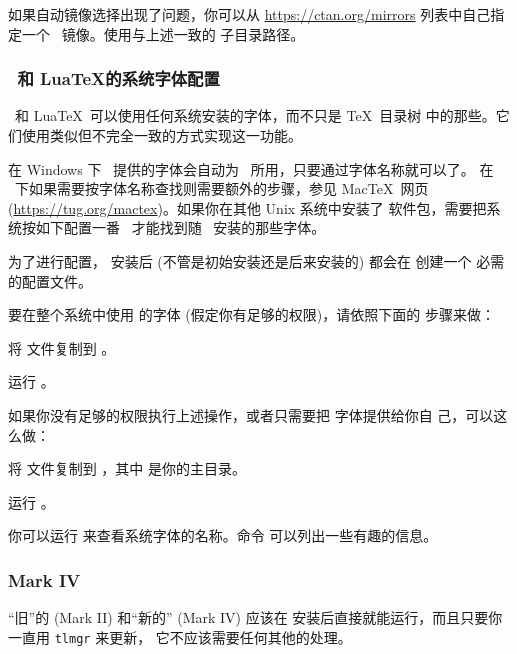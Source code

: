 \documentclass{article}
\begin{document}
如果自动镜像选择出现了问题，你可以从 \url{https://ctan.org/mirrors}
列表中自己指定一个 \CTAN\ 镜像。使用与上述一致的 
子目录路径。

\subsubsection{\protect\XeTeX\protect\ 和 Lua\protect\TeX 的系统字体配置}
\label{sec:font-conf-sys}

\XeTeX\ 和 Lua\TeX\ 可以使用任何系统安装的字体，而不只是 \TeX\ 目录树
中的那些。它们使用类似但不完全一致的方式实现这一功能。

在 Windows 下 \TL\ 提供的字体会自动为 \XeTeX\ 所用，只要通过字体名称就可以了。
在 \MacOSX\ 下如果需要按字体名称查找则需要额外的步骤，参见 Mac\TeX\ 网页
(\url{https://tug.org/mactex})。如果你在其他 Unix 系统中安装了 
软件包，需要把系统按如下配置一番 \XeTeX\ 才能找到随 \TL\ 安装的那些字体。

为了进行配置， 安装后 (不管是初始安装还是后来安装的) 都会在
 创建一个
必需的配置文件。

要在整个系统中使用 \TL{} 的字体 (假定你有足够的权限)，请依照下面的
步骤来做：
\begin{enumerate*}
\item 将  文件复制到
。
\item 运行 。
\end{enumerate*}

如果你没有足够的权限执行上述操作，或者只需要把 \TL{} 字体提供给你自
己，可以这么做：
\begin{enumerate*}
\item 将  文件复制到
      ，其中 \filename{~} 是你的主目录。
\item 运行 。
\end{enumerate*}

你可以运行  来查看系统字体的名称。命令
 可以列出一些有趣的信息。

\subsubsection{\protect\ConTeXt{} Mark IV}
\label{sec:context-mkiv}

“旧”的 \ConTeXt{} (Mark II) 和“新的” \ConTeXt{} (Mark IV)
应该在 \TL{} 安装后直接就能运行，而且只要你一直用 \verb+tlmgr+ 来更新，
它不应该需要任何其他的处理。
\end{document}
